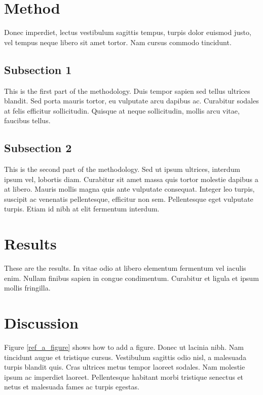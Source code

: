 \documentclass[12pt,a4paper,]{report}
\begin{document}
\section{Method}\label{method-1}

Donec imperdiet, lectus vestibulum sagittis tempus, turpis dolor euismod
justo, vel tempus neque libero sit amet tortor. Nam cursus commodo
tincidunt.

\subsection{Subsection 1}\label{subsection-1}

This is the first part of the methodology. Duis tempor sapien sed tellus
ultrices blandit. Sed porta mauris tortor, eu vulputate arcu dapibus ac.
Curabitur sodales at felis efficitur sollicitudin. Quisque at neque
sollicitudin, mollis arcu vitae, faucibus tellus.

\subsection{Subsection 2}\label{subsection-2-1}

This is the second part of the methodology. Sed ut ipsum ultrices,
interdum ipsum vel, lobortis diam. Curabitur sit amet massa quis tortor
molestie dapibus a at libero. Mauris mollis magna quis ante vulputate
consequat. Integer leo turpis, suscipit ac venenatis pellentesque,
efficitur non sem. Pellentesque eget vulputate turpis. Etiam id nibh at
elit fermentum interdum.

\section{Results}\label{results-2}

These are the results. In vitae odio at libero elementum fermentum vel
iaculis enim. Nullam finibus sapien in congue condimentum. Curabitur et
ligula et ipsum mollis fringilla.

\section{Discussion}\label{discussion-1}

Figure \ref{ref_a_figure} shows how to add a figure. Donec ut lacinia
nibh. Nam tincidunt augue et tristique cursus. Vestibulum sagittis odio
nisl, a malesuada turpis blandit quis. Cras ultrices metus tempor
laoreet sodales. Nam molestie ipsum ac imperdiet laoreet. Pellentesque
habitant morbi tristique senectus et netus et malesuada fames ac turpis
egestas.
\end{document}
